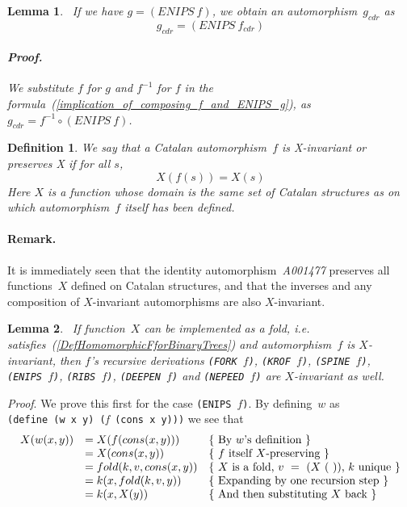 \documentclass[11pt]{article} %
\newtheorem{lemma}{Lemma}
\newcommand{\eqn}[1]{(\ref{#1})}
\newcommand{\eeq}{\end{equation}}
\newcommand{\beql}[1]{\begin{equation}\label{#1}}
\newcommand{\autname}[1]{{\it *#1}}
\newcommand{\autletter}[1]{$#1$}
\newcommand{\automorphismlet}[1]{automorphism~\autletter{#1}}
\newcommand{\automorphism}[1]{automorphism~\autname{#1}}
\newcommand{\scmcode}[1]{{\tt{#1}}}
\newcommand{\scmcodeintext}[1]{{\tt{#1}}}
\newtheorem{definition}[theorem]{Definition}
\newcommand{\nilatom}{\ensuremath{\mathbf{(~)}}\xspace}
\newcommand{\funapply}{\ensuremath{\circ}}
\begin{document}
\begin{lemma}~\label{lemma_obtaining_g_cdr}
\normalfont
If we have $g = (ENIPS~f)$, we obtain an \automorphismlet{g_{cdr}}
as
\beql{obtaining_g_cdr}
g_{cdr} = (ENIPS~f_{cdr})
\eeq
\paragraph{\textit{Proof.}}
We substitute $f$ for $g$ and
$f^{-1}$ for $f$ in the formula~\eqn{implication_of_composing_f_and_ENIPS_g},
as $g_{cdr} = f^{-1} \funapply (ENIPS~f)$.

\end{lemma}

\normalfont
\begin{definition} %
\normalfont
We say that
a Catalan \automorphismlet{f} is {\em X-invariant} or {\em preserves X}
if for all $s$,
\beql{DefXinvariance}
    X(f(s)) = X(s)
\eeq
Here $X$ is a function whose domain is the same set
of Catalan structures as on which \automorphismlet{f}
itself has been defined.
\end{definition}

\paragraph{Remark.}
It is immediately seen that the identity \automorphism{A001477}
preserves all functions~$X$ defined on Catalan structures,
and that the inverses and any composition of $X$-invariant automorphisms
are also $X$-invariant.


\begin{lemma}~\label{ExampleA_of_preservation_of_X_invariance}
If function~$X$ can be implemented as a fold,
i.e. satisfies~\eqn{DefHomomorphicFforBinaryTrees}
and \automorphismlet{f} is $X$-invariant,
then $f$'s recursive derivations
 \scmcodeintext{(FORK~$f$)},
 \scmcodeintext{(KROF~$f$)},
 \scmcodeintext{(SPINE~$f$)},
 \scmcodeintext{(ENIPS~$f$)},
 \scmcodeintext{(RIBS~$f$)},
\scmcodeintext{(DEEPEN~$f$)} and
\scmcodeintext{(NEPEED~$f$)}
are $X$-invariant as well.
\end{lemma}

\textit{Proof}.
We prove this first for the case \scmcodeintext{(ENIPS~$f$)}.
By defining~$w$ as \scmcode{(define~(w~x~y)~(}{\em f}\scmcode{~(cons~x~y)))}
we see that
\beql{X_identity2}
\begin{array}{lll}
X(w(x,y))      & = X(f(cons(x,y))) & $\{ By $w$'s definition \}$\\
               & = X(cons(x,y)) & $\{ $f$ itself $X$-preserving \}$\\
               & = fold(k,v,cons(x,y)) & $\{ $X$ is a fold, $v~=~(X~\nilatom)$, $k$ unique \}$\\
               & = k(x,fold(k,v,y)) & $\{ Expanding by one recursion step \}$\\
               & = k(x,X(y)) & $\{ And then substituting $X$ back \}$\\
\end{array}
\eeq
\end{document}
